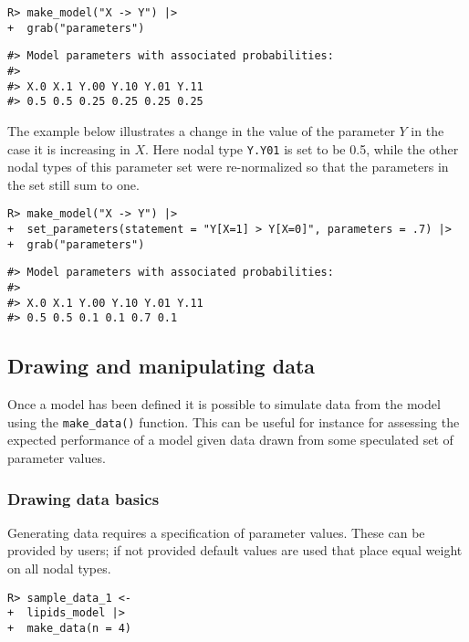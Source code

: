 \documentclass[
  11pt,
  article]{jss}
\begin{document}
\begin{verbatim}
R> make_model("X -> Y") |> 
+  grab("parameters")
\end{verbatim}

\begin{verbatim}
#> Model parameters with associated probabilities: 
#> 
#> X.0 X.1 Y.00 Y.10 Y.01 Y.11
#> 0.5 0.5 0.25 0.25 0.25 0.25
\end{verbatim}

The example below illustrates a change in the value of the parameter
\(Y\) in the case it is increasing in \(X\). Here nodal type
\texttt{Y.Y01} is set to be 0.5, while the other nodal types of this
parameter set were re-normalized so that the parameters in the set still
sum to one.

\begin{verbatim}
R> make_model("X -> Y") |>
+  set_parameters(statement = "Y[X=1] > Y[X=0]", parameters = .7) |>
+  grab("parameters")
\end{verbatim}

\begin{verbatim}
#> Model parameters with associated probabilities: 
#> 
#> X.0 X.1 Y.00 Y.10 Y.01 Y.11
#> 0.5 0.5 0.1 0.1 0.7 0.1
\end{verbatim}

\hypertarget{drawing-and-manipulating-data}{%
\subsection{Drawing and manipulating
data}\label{drawing-and-manipulating-data}}

Once a model has been defined it is possible to simulate data from the
model using the \texttt{make\_data()} function. This can be useful for
instance for assessing the expected performance of a model given data
drawn from some speculated set of parameter values.

\hypertarget{drawing-data-basics}{%
\subsubsection{Drawing data basics}\label{drawing-data-basics}}

Generating data requires a specification of parameter values. These can
be provided by users; if not provided default values are used that place
equal weight on all nodal types.

\begin{verbatim}
R> sample_data_1 <- 
+  lipids_model |> 
+  make_data(n = 4)
\end{verbatim}
\end{document}
